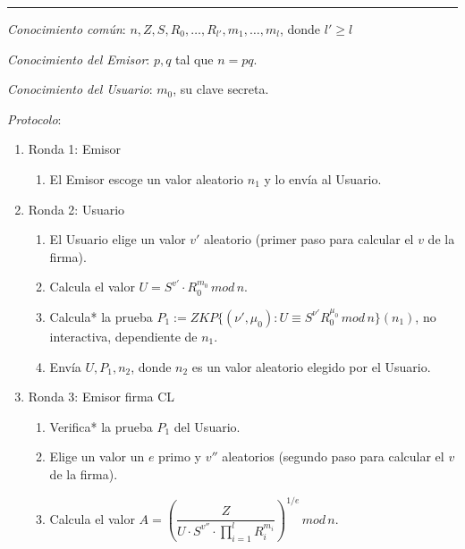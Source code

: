 \rule{\textwidth}{1pt}
\begin{algorithm}
	\hfil
	
	\textit{Conocimiento común}: $n,Z,S,R_0,\dots,R_{l'},m_1,\dots,m_l$, donde $l'\geq l$
	
	\textit{Conocimiento del Emisor}: $p,q$ tal que $n=pq$.
	
	\textit{Conocimiento del Usuario}: $m_0$, su clave secreta.
	
	\hfil
	
	\textit{Protocolo}:
	\begin{enumerate}
		\item Ronda 1: Emisor
		\begin{enumerate}[label*=\arabic*.]
			\item El Emisor escoge un valor aleatorio $n_1$ y lo envía al Usuario.
		\end{enumerate}
		
		\item Ronda 2: Usuario
		\begin{enumerate}[label*=\arabic*.]
		
			\item El Usuario elige un valor $v'$ aleatorio (primer paso para calcular el $v$ de la firma).
			
			\item Calcula el valor $U = S^{v'} \cdot R_0^{m_0} \, mod \, n$.
			
			\item Calcula* la prueba $P_1 := ZKP\{(\nu',\mu_0) : U \equiv S^{\nu'}R_0^{\mu_0} \, mod \, n \}(n_1)$, no interactiva, dependiente de $n_1$.
			
			\item Envía $U,P_1,n_2$, donde $n_2$ es un valor aleatorio elegido por el Usuario.

		\end{enumerate}

		\item Ronda 3: Emisor firma CL
		\begin{enumerate}[label*=\arabic*.]
			\item Verifica* la prueba $P_1$ del Usuario.
			
			\item Elige un valor un $e$ primo y $v''$ aleatorios (segundo paso para calcular el $v$ de la firma).
			
			\item Calcula el valor $A = \left(  \dfrac{Z}{U\cdot S^{v''}\cdot \prod_{i=1}^{l} R_i^{m_i}} \right)^{1/e} \, mod \, n$.
			

\end{enumerate}
\end{enumerate}
\end{algorithm}

